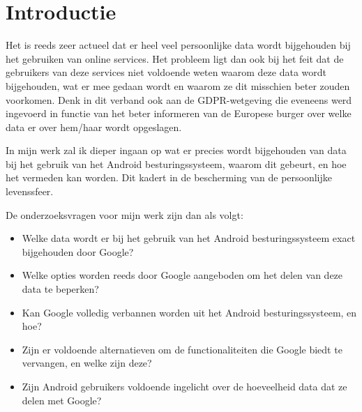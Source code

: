 
\section{Introductie} %
\label{sec:introductie}



Het is reeds zeer actueel dat er heel veel persoonlijke data wordt bijgehouden bij het gebruiken van online services. Het probleem ligt dan ook bij het feit dat de gebruikers van deze services niet voldoende weten waarom deze data wordt bijgehouden, wat er mee gedaan wordt en waarom ze dit misschien beter zouden voorkomen. Denk in dit verband ook aan de GDPR-wetgeving die eveneens werd ingevoerd in functie van het beter informeren van de Europese burger over welke data er over hem/haar wordt opgeslagen. 

\vspace{2mm}

In mijn werk zal ik dieper ingaan op wat er precies wordt bijgehouden van data bij het gebruik van het Android besturingssysteem, waarom dit gebeurt, en hoe het vermeden kan worden. Dit kadert in de bescherming van de persoonlijke levenssfeer. 

\vspace{2mm}

\noindent De onderzoeksvragen voor mijn werk zijn dan als volgt:


\begin{itemize}
  \item Welke data wordt er bij het gebruik van het Android besturingssysteem exact bijgehouden door Google?
  \item Welke opties worden reeds door Google aangeboden om het delen van deze data te beperken?
  \item Kan Google volledig verbannen worden uit het Android besturingssysteem, en hoe?
  \item Zijn er voldoende alternatieven om de functionaliteiten die Google biedt te vervangen, en welke zijn deze?
  \item Zijn Android gebruikers voldoende ingelicht over de hoeveelheid data dat ze delen met Google?
\end{itemize}


